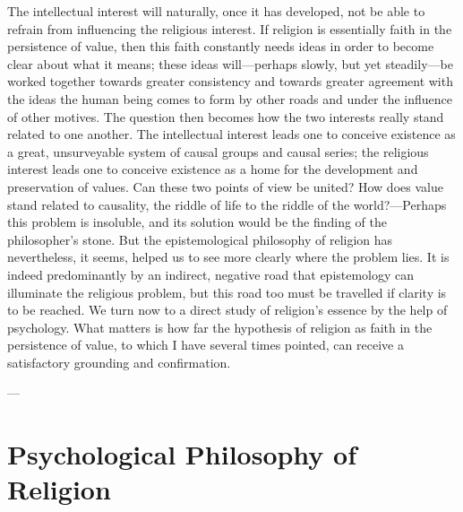 \documentclass[12pt,a4paper]{book}
\newcommand{\opage}[1]{\marginnote{\footnotesize\textit{[#1]}}}
\begin{document}
The intellectual interest will naturally, once it has developed, not be able
to refrain from influencing the religious interest. If religion is essentially
faith in the persistence of value, then this faith constantly needs ideas in
order to become clear about what it means; these ideas will---perhaps slowly,
but yet steadily---be worked together towards greater consistency and towards
greater agreement with the ideas the human being comes to form by other roads
and under the influence of other motives. The question then becomes how the
two interests really stand related to one another. The intellectual interest
leads one to conceive existence as a great, unsurveyable system 
\opage{50}of causal
groups and causal series; the religious interest leads one to conceive
existence as a home for the development and preservation of values. Can these
two points of view be united? How does value stand related to causality, the
riddle of life to the riddle of the world?---Perhaps this problem is
insoluble, and its solution would be the finding of the philosopher's stone.
But the epistemological philosophy of religion has nevertheless, it seems,
helped us to see more clearly where the problem lies. It is indeed
predominantly by an indirect, negative road that epistemology can illuminate
the religious problem, but this road too must be travelled if clarity is to be
reached. We turn now to a direct study of religion's essence by the help of
psychology. What matters is how far the hypothesis of religion as faith in the
persistence of value, to which I have several times pointed, can receive a
satisfactory grounding and confirmation.

\begin{center}---\end{center}

\chapter[Psychological Philosophy of Religion]{Psychological Philosophy of Religion\opage{51}}
\label{ch:psychology}

\end{document}
